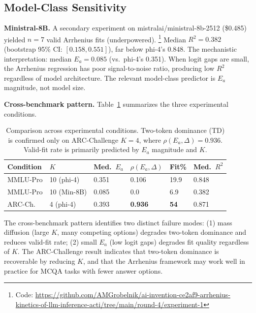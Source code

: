 \documentclass[11pt,letterpaper,twocolumn]{article}
\begin{document}
\subsection{Model-Class Sensitivity}

\textbf{Ministral-8B.} A secondary experiment on mistralai/ministral-8b-2512 (\$0.485)
yielded $n=7$ valid Arrhenius fits (underpowered).%
\footnote{Code: \url{https://github.com/AMGrobelnik/ai-invention-ce2af9-arrhenius-kinetics-of-llm-inference-acti/tree/main/round-4/experiment-1}}
Median $R^2 = 0.382$ (bootstrap 95\% CI: $[0.158, 0.551]$), far below phi-4's 0.848. The
mechanistic interpretation: median $E_a = 0.085$ (vs.\ phi-4's 0.351). When logit gaps
are small, the Arrhenius regression has poor signal-to-noise ratio, producing low $R^2$
regardless of model architecture. The relevant model-class predictor is $E_a$ magnitude,
not model size.

\textbf{Cross-benchmark pattern.} Table~\ref{tab:crossbench} summarizes the three
experimental conditions.

\begin{table}[!htbp]
\centering
\caption{Comparison across experimental conditions. Two-token dominance (TD) is confirmed
only on ARC-Challenge $K=4$, where $\rho(E_a, \Delta)=0.936$. Valid-fit rate is primarily
predicted by $E_a$ magnitude and $K$.}
\label{tab:crossbench}
\small
\begin{tabular}{llllll}
\hline
Condition & $K$ & Med.\ $E_a$ & $\rho(E_a,\Delta)$ & Fit\% & Med.\ $R^2$ \\
\hline
MMLU-Pro & 10 (phi-4) & 0.351 & 0.106 & 19.9 & 0.848 \\
MMLU-Pro & 10 (Min-8B) & 0.085 & 0.0 & 6.9 & 0.382 \\
ARC-Ch.  & 4  (phi-4) & 0.393 & \textbf{0.936} & \textbf{54} & 0.871 \\
\hline
\end{tabular}
\end{table}

The cross-benchmark pattern identifies two distinct failure modes: (1) mass diffusion
(large $K$, many competing options) degrades two-token dominance and reduces valid-fit
rate; (2) small $E_a$ (low logit gaps) degrades fit quality regardless of $K$. The
ARC-Challenge result indicates that two-token dominance is recoverable by reducing $K$,
and that the Arrhenius framework may work well in practice for MCQA tasks with fewer
answer options.

\end{document}
